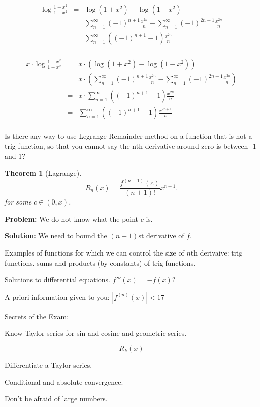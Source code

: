 \documentclass{article}
\newtheorem*{theorem}{Theorem}
\theoremstyle{definition}
\begin{document}
\begin{eqnarray*}
\log \frac{1+x^2}{1-x^2} &=& \log (1+x^2) - \log (1-x^2) \\
&=& \sum^{\infty}_{n=1} (-1)^{n+1}\frac{x^{2n}}n - \sum^{\infty}_{n=1} (-1)^{2n+1} \frac{x^{2n}}n \\
&=& \sum^{\infty}_{n=1} \left( (-1)^{n+1} - 1 \right) \frac{x^{2n}}n \\
\end{eqnarray*}

\begin{eqnarray*}
x \cdot \log \frac{1+x^2}{1-x^2} &=& x \cdot \left(\log (1+x^2) - \log (1-x^2)\right) \\
&=& x \cdot \left( \sum^{\infty}_{n=1} (-1)^{n+1}\frac{x^{2n}}n - \sum^{\infty}_{n=1} (-1)^{2n+1} \frac{x^{2n}}n \right) \\
&=& x \cdot \sum^{\infty}_{n=1} \left( (-1)^{n+1} - 1 \right) \frac{x^{2n}}n \\
&=& \sum^{\infty}_{n=1} \left( (-1)^{n+1} - 1 \right) \frac{x^{2n + 1}}n \\
\end{eqnarray*}

Is there any way to use Legrange Remainder method on a
function that is not a trig function, so that you cannot say
the nth derivative around zero is between -1 and 1?

\begin{theorem}[Lagrange]
$$  R_n(x) = \frac{f^{(n+1)}(c)}{(n+1)!} x^{n+1}.$$
for some $c \in (0,x)$.
\end{theorem}

\textbf{Problem:} We do not know what the point $c$ is.

\textbf{Solution:} We need to bound the $(n+1)$st derivative of $f$.

Examples of functions for which we can control the size of $n$th
derivaive: trig functions.  sums and products (by constants) of trig
functions.

Solutions to differential equations.  $f'''(x) = -f(x)$?

A priori information given to you: $|f^{(n)}(x)| < 17$

Secrets of the Exam:

Know Taylor series for sin and cosine and geometric series.

$$
R_k(x)
$$

Differentiate a Taylor series.

Conditional and absolute convergence.

Don't be afraid of large numbers.
\end{document}
